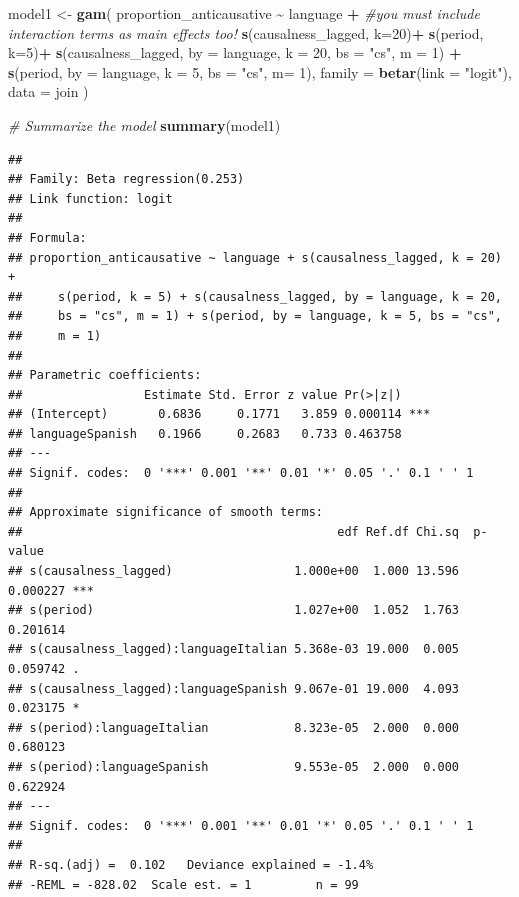 \documentclass[
]{article}
\newenvironment{Shaded}{\begin{snugshade}}{\end{snugshade}}
\newcommand{\AttributeTok}[1]{\textcolor[rgb]{0.13,0.29,0.53}{#1}}
\newcommand{\CommentTok}[1]{\textcolor[rgb]{0.56,0.35,0.01}{\textit{#1}}}
\newcommand{\DecValTok}[1]{\textcolor[rgb]{0.00,0.00,0.81}{#1}}
\newcommand{\FunctionTok}[1]{\textcolor[rgb]{0.13,0.29,0.53}{\textbf{#1}}}
\newcommand{\NormalTok}[1]{#1}
\newcommand{\OtherTok}[1]{\textcolor[rgb]{0.56,0.35,0.01}{#1}}
\newcommand{\SpecialCharTok}[1]{\textcolor[rgb]{0.81,0.36,0.00}{\textbf{#1}}}
\newcommand{\StringTok}[1]{\textcolor[rgb]{0.31,0.60,0.02}{#1}}
\begin{document}
\begin{Shaded}
\begin{Highlighting}[]
\NormalTok{model1 }\OtherTok{\textless{}{-}} \FunctionTok{gam}\NormalTok{(}
\NormalTok{  proportion\_anticausative }\SpecialCharTok{\textasciitilde{}} 
\NormalTok{    language }\SpecialCharTok{+} \CommentTok{\#you must include interaction terms as main effects too!}
    \FunctionTok{s}\NormalTok{(causalness\_lagged, }\AttributeTok{k=}\DecValTok{20}\NormalTok{)}\SpecialCharTok{+}
    \FunctionTok{s}\NormalTok{(period, }\AttributeTok{k=}\DecValTok{5}\NormalTok{)}\SpecialCharTok{+}
    \FunctionTok{s}\NormalTok{(causalness\_lagged, }\AttributeTok{by =}\NormalTok{ language, }\AttributeTok{k =} \DecValTok{20}\NormalTok{, }\AttributeTok{bs =} \StringTok{"cs"}\NormalTok{, }\AttributeTok{m =} \DecValTok{1}\NormalTok{) }\SpecialCharTok{+} 
    \FunctionTok{s}\NormalTok{(period, }\AttributeTok{by =}\NormalTok{ language, }\AttributeTok{k =} \DecValTok{5}\NormalTok{, }\AttributeTok{bs =} \StringTok{"cs"}\NormalTok{, }\AttributeTok{m=} \DecValTok{1}\NormalTok{),   }
  \AttributeTok{family =} \FunctionTok{betar}\NormalTok{(}\AttributeTok{link =} \StringTok{"logit"}\NormalTok{),                 }
  \AttributeTok{data =}\NormalTok{ join}
\NormalTok{)}

\CommentTok{\# Summarize the model}
\FunctionTok{summary}\NormalTok{(model1)}
\end{Highlighting}
\end{Shaded}

\begin{verbatim}
## 
## Family: Beta regression(0.253) 
## Link function: logit 
## 
## Formula:
## proportion_anticausative ~ language + s(causalness_lagged, k = 20) + 
##     s(period, k = 5) + s(causalness_lagged, by = language, k = 20, 
##     bs = "cs", m = 1) + s(period, by = language, k = 5, bs = "cs", 
##     m = 1)
## 
## Parametric coefficients:
##                 Estimate Std. Error z value Pr(>|z|)    
## (Intercept)       0.6836     0.1771   3.859 0.000114 ***
## languageSpanish   0.1966     0.2683   0.733 0.463758    
## ---
## Signif. codes:  0 '***' 0.001 '**' 0.01 '*' 0.05 '.' 0.1 ' ' 1
## 
## Approximate significance of smooth terms:
##                                            edf Ref.df Chi.sq  p-value    
## s(causalness_lagged)                 1.000e+00  1.000 13.596 0.000227 ***
## s(period)                            1.027e+00  1.052  1.763 0.201614    
## s(causalness_lagged):languageItalian 5.368e-03 19.000  0.005 0.059742 .  
## s(causalness_lagged):languageSpanish 9.067e-01 19.000  4.093 0.023175 *  
## s(period):languageItalian            8.323e-05  2.000  0.000 0.680123    
## s(period):languageSpanish            9.553e-05  2.000  0.000 0.622924    
## ---
## Signif. codes:  0 '***' 0.001 '**' 0.01 '*' 0.05 '.' 0.1 ' ' 1
## 
## R-sq.(adj) =  0.102   Deviance explained = -1.4%
## -REML = -828.02  Scale est. = 1         n = 99
\end{verbatim}
\end{document}

